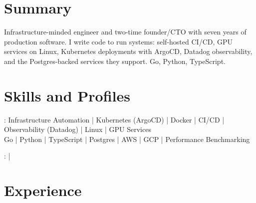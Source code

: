 \documentclass[print]{jack-resume}
\begin{document}
\pagecolor{darkmodeBackground}


\begin{minipage}[t][1cm][t]{.03\textwidth}
    \hfill
\end{minipage}

\section{Summary}
Infrastructure-minded engineer and two-time founder/CTO with seven years of production software. I write code to run systems: self-hosted CI/CD, GPU services on Linux, Kubernetes deployments with ArgoCD, Datadog observability, and the Postgres-backed services they support. Go, Python, TypeScript.
\sectionsep

\section{Skills and Profiles}
:
Infrastructure Automation \hfill | \hfill
Kubernetes (ArgoCD) \hfill | \hfill
Docker \hfill | \hfill
CI/CD \hfill | \hfill
Observability (Datadog) \hfill | \hfill
Linux \hfill | \hfill
GPU Services \\
\hspace{1.0cm} Go \hfill | \hfill
Python \hfill | \hfill
TypeScript \hfill | \hfill
Postgres \hfill | \hfill
AWS \hfill | \hfill
GCP \hfill | \hfill
Performance Benchmarking \\

\raggedright{
    :
      \href{https://www.linkedin.com/in/jack-sturtevant/}{ \ExternalLink} |
     \href{https://github.com/jacksturt}{ \ExternalLink}}

\section{Experience}
\end{document}
